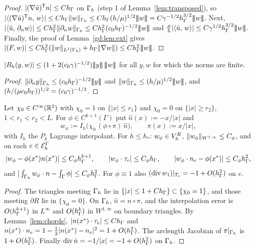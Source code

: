 \begin{proof}
$|(\nabla\tilde u)^{\mathsf T}n|\le Ch_\Gamma$ on $\Gamma_h$ (step 1 of Lemma~\ref{lem:transposed}), so $|\ip{(\nabla\ut)^{\mathsf T}n}w|\le C\hG\norm w_{\Gh}\le C\hG(h/\mu)^{1/2}\tnorm w=C\gamma^{-1/2}\hG^{3/2}\tnorm w$. Next, $|\langle \tilde u,\, \partial_n w\rangle|\le Ch_\Gamma^2\lVert \partial_n w\rVert_{\Gamma_h}\le Ch_\Gamma^2(c_0h_\Gamma)^{-1/2}|\!|\!|w|\!|\!|$ and $\frac\mu h|\langle \tilde u,\, w\rangle|\le C\gamma^{1/2}h_\Gamma^{3/2}|\!|\!|w|\!|\!|$. Finally, the proof of Lemma~\ref{gd:lem:ext} gives $|(F,w)|\le Ch_\Gamma^2(\lVert w\rVert_{L^1(\Gamma_h)}+h_\Gamma\lVert \nabla w\rVert)\le Ch_\Gamma^2|\!|\!|w|\!|\!|$.
\end{proof}

\begin{lemma}[$\Bh$ is bounded]\label{pd:lem:Bh}
$|\Bh(y,w)|\le(1+2(c_0\gamma)^{-1/2})\tnorm y\,\tnorm w$ for all $y,w$ for which the norms are finite.
\end{lemma}

\begin{proof}
$\lVert \partial_n y\rVert_{\Gamma_h}\le(c_0h_\Gamma)^{-1/2}|\!|\!|y|\!|\!|$ and $\lVert w\rVert_{\Gamma_h}\le(h/\mu)^{1/2}|\!|\!|w|\!|\!|$, and $(h/(\mu c_0h_\Gamma))^{1/2}=(c_0\gamma)^{-1/2}$.
\end{proof}

\begin{lemma}\label{pd:lem:wphi}
Let $\chi_0\in C^\infty(\mathbb R^2)$ with $\chi_0=1$ on $\{|x|\le r_1\}$ and $\chi_0=0$ on $\{|x|\ge r_2\}$, $1<r_1<r_2<L$. For $\phi\in C^{k+1}(\Gamma)$ put $\hat n(x):=-x/|x|$ and
\[
w_\phi:=I_h\bigl(\chi_0\,(\phi\circ\pi)\,\hat n\bigr),\qquad\pi(x):=x/|x|,
\]
with $I_h$ the $P_k$ Lagrange interpolant. For $h\le h_\ast$: $w_\phi\in V_h^R$, $\lVert w_\phi\rVert_{W^{1,\infty}}\le C_\phi$, and on each $e\in\mathcal E_h^\Gamma$
\[
|w_\phi-\phi(x^\ast)n(x^\ast)|\le C_\phi h_\Gamma^{k+1},\qquad |w_\phi\cdot\tau_e|\le C_\phi h_\Gamma,\qquad |w_\phi\cdot n_e-\phi(x^\ast)|\le C_\phi h_\Gamma^2,
\]
and $|\int_{\Gamma_h}w_\phi\cdot n-\int_\Gamma\phi|\le C_\phi h_\Gamma^2$. For $\phi\equiv1$ also $(\operatorname{div} w_1)|_{T_e}=-1+O(h_\Gamma^2)$ on $e$.
\end{lemma}

\begin{proof}
The triangles meeting $\Gamma_h$ lie in $\{|x|\le1+Ch_\Gamma\}\subset\{\chi_0=1\}$, and those meeting $\partial R$ lie in $\{\chi_0=0\}$. On $\Gamma_h$, $\hat n=n\circ\pi$, and the interpolation error is $O(h_\Gamma^{k+1})$ in $L^\infty$ and $O(h_\Gamma^k)$ in $W^{1,\infty}$ on boundary triangles. By Lemma~\ref{lem:chords}, $|n(x^\ast)\cdot\tau_e|\le Ch_\Gamma$ and $n(x^\ast)\cdot n_e=1-\frac12|n(x^\ast)-n_e|^2=1+O(h_\Gamma^2)$. The arclength Jacobian of $\pi|_{\Gamma_h}$ is $1+O(h_\Gamma^2)$. Finally $\operatorname{div}\hat n=-1/|x|=-1+O(h_\Gamma^2)$ on $\Gamma_h$.
\end{proof}

